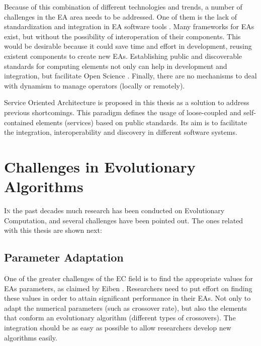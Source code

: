 Because of this combination of different technologies and trends, %
a number of challenges in the EA area needs to be addressed.  One of
them is the lack of standardization and integration in EA software
tools \cite{SURVEYMOFS}. Many frameworks for EAs exist, but without
the possibility of interoperation of their components. 
This would be desirable because it could save time and effort in 
development, reusing existent components to create new EAs. %
Establishing public and discoverable standards for computing elements
not only can help in development and integration, but facilitate Open
Science \cite{Foster2005Science}. Finally, there are no mechanisms to
deal with dynamism to manage operators (locally or remotely). %

Service Oriented Architecture \cite{Papazoglou2007SOA} is proposed in
this thesis as a solution to address previous shortcomings. This
paradigm defines the usage of loose-coupled and self-contained
elements (services) based on public standards. Its aim is to facilitate
the integration, interoperability and discovery in different software
systems. 


\section{Challenges in Evolutionary Algorithms}
\label{sec:intro:challenges}

\lettrine{I}{n} the past decades much research has been conducted on Evolutionary Computation, and several challenges have been pointed out. The ones related with this thesis are shown next:

\subsection{Parameter Adaptation}

One of the greater challenges of the EC field is to find the appropriate values for EAs parameters, as claimed by {\person Eiben \etal} 
\cite{Eiben12Parameters}. Researchers need to put effort on finding these values in order to
attain significant performance in their EAs. Not only to adapt the numerical parameters (such as crossover rate), but also the elements that conform an evolutionary algorithm (different types of crossovers). The integration should be as easy as possible to allow researchers develop new algorithms easily. 


